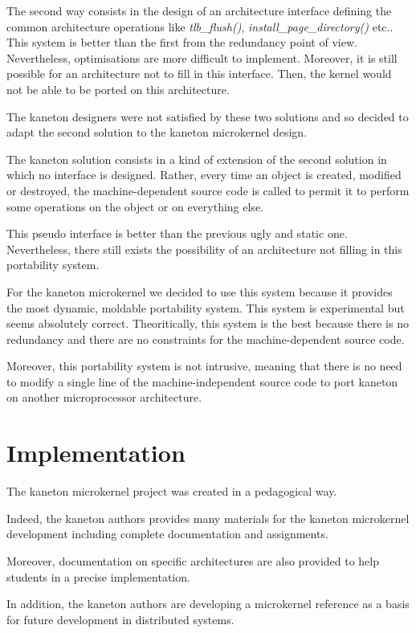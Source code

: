 \begin{multicols}{2}
The second way consists in the design of an architecture interface defining
the common architecture operations like \textit{tlb\_flush()},
\textit{install\_page\_directory()} etc.. This system is better than the
first from the redundancy point of view. Nevertheless, optimisations are more
difficult to implement. Moreover, it is still possible for an architecture
not to fill in this interface. Then, the kernel would not be able to be
ported on this architecture.

The kaneton designers were not satisfied by these two solutions and so
decided to adapt the second solution to the kaneton microkernel design.

The kaneton solution consists in a kind of extension of the second solution
in which no interface is designed. Rather, every time an object is
created, modified or destroyed, the machine-dependent source code is called
to permit it to perform some operations on the object or on everything else.

This pseudo interface is better than the previous ugly and static one.
Nevertheless, there still exists the possibility of an architecture not
filling in this portability system.

For the kaneton microkernel we decided to use this system because
it provides the most dynamic, moldable portability system. This system is
experimental but seems absolutely correct. Theoritically, this system
is the best because there is no redundancy and there are no constraints
for the machine-dependent source code.

Moreover, this portability system is not intrusive, meaning that there
is no need to modify a single line of the machine-independent source code
to port kaneton on another microprocessor architecture.

%
%

\section{Implementation}

The kaneton microkernel project was created in a pedagogical way.

Indeed, the kaneton authors provides many materials for the kaneton
microkernel development including complete documentation and assignments.

Moreover, documentation on specific architectures are also provided
to help students in a precise implementation.

In addition, the kaneton authors are developing a microkernel reference
as a basis for future development in distributed systems.


\end{multicols}
